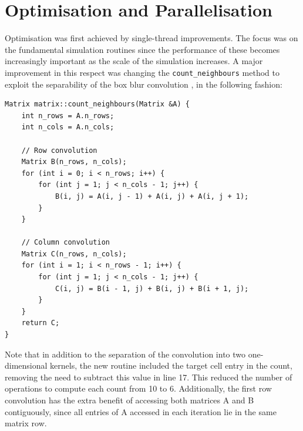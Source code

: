 \documentclass[12pt]{article}
\begin{document}
\section{Optimisation and Parallelisation}

Optimisation was first achieved by single-thread improvements.
The focus was on the fundamental simulation routines since the performance of these becomes increasingly important as the scale of the simulation increases.
A major improvement in this respect was changing the \texttt{count\_neighbours} method to exploit the separability of the box blur convolution \cite{sepfilter},
in the following fashion:

\begin{lstlisting}
Matrix matrix::count_neighbours(Matrix &A) {
    int n_rows = A.n_rows;
    int n_cols = A.n_cols;

    // Row convolution
    Matrix B(n_rows, n_cols);
    for (int i = 0; i < n_rows; i++) {
        for (int j = 1; j < n_cols - 1; j++) {
            B(i, j) = A(i, j - 1) + A(i, j) + A(i, j + 1);
        }
    }

    // Column convolution
    Matrix C(n_rows, n_cols);
    for (int i = 1; i < n_rows - 1; i++) {
        for (int j = 1; j < n_cols - 1; j++) {
            C(i, j) = B(i - 1, j) + B(i, j) + B(i + 1, j);
        }
    }
    return C;
}
\end{lstlisting}

Note that in addition to the separation of the convolution into two one-dimensional kernels, the new routine included the target cell entry in the count,
removing the need to subtract this value in line 17.
This reduced the number of operations to compute each count from 10 to 6.
Additionally, the first row convolution has the extra benefit of accessing both matrices A and B contiguously,
since all entries of A accessed in each iteration lie in the same matrix row.
\end{document}
